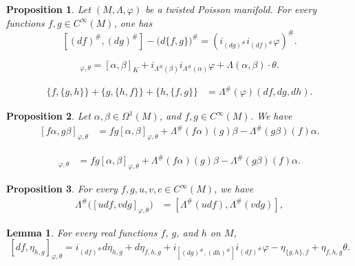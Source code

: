 \documentclass[10pt,a4paper]{amsart}
\newtheorem{proposition}{Proposition}
\newtheorem{lemma}{Lemma}
\begin{document}
\begin{proposition}\label{prop1}
	Let $(M,\Lambda,\varphi)$ be a twisted Poisson manifold. For every functions $f,g \in C^\infty(M)$, one has
	\begin{equation*}
		\left[(df)^{\#},(dg)^{\#}\right]-\big(d\{f,g\}\big)^{\#} = (i_{(dg)^{\#}}i_{(df)^{\#}}\varphi)^{\#}.
	\end{equation*}
\end{proposition}

\begin{equation}
	[\alpha, \beta]_{\varphi, \theta} = [\alpha, \beta]_K + i_{\Lambda^{\#}(\beta)} i_{\Lambda^{\#}(\alpha)} \varphi + \Lambda(\alpha, \beta) \cdot \theta. \label{expresscrochet}
\end{equation}

			\begin{align}\label{Jac}
				\{f,\{g,h\}\}+\{g,\{h,f\}\}+\{h,\{f,g\}\}&=\Lambda^{\#}(\varphi)(df,dg,dh).
			\end{align}

		\begin{proposition}\label{inc4}
			Let  $\alpha, \beta\in\Omega^1(M)$, and $f,g \in C^\infty(M)$. We have
			\begin{align}\label{inc1}
				[f\alpha,g\beta]_{\varphi,\theta}&=fg[\alpha,\beta]_{\varphi,\theta}+\Lambda^{\#}(f\alpha)(g)\beta-\Lambda^{\#}(g\beta)(f)\alpha.
			\end{align}
		\end{proposition}

			\begin{align}
				[f\alpha,g\beta]_{\varphi,\theta}&=fg[\alpha,\beta]_{\varphi,\theta}+\Lambda^{\#}(f\alpha)(g)\beta-\Lambda^{\#}(g\beta)(f)\alpha.
			\end{align}

		\begin{proposition}\label{inc2}
		For every $f,g,u ,v,c\in C^\infty(M)$, we have
			\begin{align*}
				\Lambda^{\#}\big([udf,vdg]_{\varphi,\theta}\big)&=[\Lambda^{\#}(udf),\Lambda^{\#}(vdg)],
			\end{align*}
		\end{proposition}

		\begin{lemma}\label{lemm1} For every real functions $f$, $g$, and $h$ on $M$,
			$$[df,\eta_{h,g}]_{\varphi,\theta}=i_{(df)^{\#}}d\eta_{h,g}+d\eta_{f,h,g}+ i_{[(dg)^{\#},(dh)^{\#}]}i_{(df)^{\#}}\varphi-\eta_{\{g,h\},f}+\eta_{f,h,g}\theta.$$
		\end{lemma}
\end{document}

